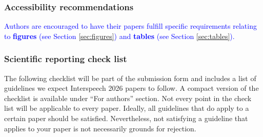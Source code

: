 \documentclass[cameraready]{Interspeech}
\newcommand{\blue}[1]{\textcolor{blue}{#1}}
\begin{document}
\subsubsection{Accessibility recommendations}

\blue{Authors are encouraged to have their papers fulfill specific requirements relating to \textbf{figures} (see Section \ref{sec:figures}) and \textbf{tables} (see Section \ref{sec:tables}).}


\subsubsection{Scientific reporting check list}

The following checklist will be part of the submission form and includes a list of guidelines we expect Interspeech 2026 papers to follow. A compact version of the checklist is available under ``For authors'' section. Not every point in the check list will be applicable to every paper. Ideally, all guidelines that do apply to a certain paper should be satisfied. Nevertheless, not satisfying a guideline that applies to your paper is not necessarily grounds for rejection.
\end{document}
